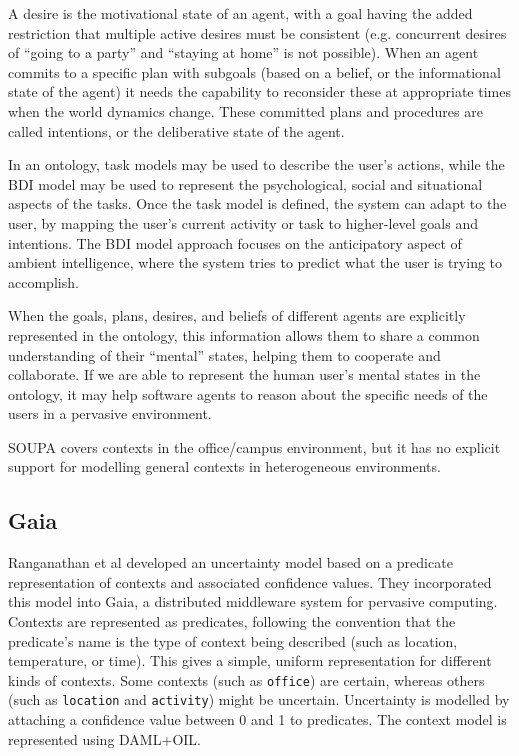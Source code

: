 A desire is the motivational state of an agent, with a goal having the added restriction that multiple active desires must be consistent (e.g. concurrent desires of ``going to a party'' and ``staying at home'' is not possible). When an agent commits to a specific plan with subgoals (based on a belief, or the informational state of the agent) it needs the capability to reconsider these at appropriate times when the world dynamics change. These committed plans and procedures are called intentions, or the deliberative state of the agent.



In an ontology, task models may be used to describe the user's actions, while the \ac{BDI} model may be used to represent the psychological, social and situational aspects of the tasks. Once the task model is defined, the system can adapt to the user, by mapping the user's current activity or task to higher-level goals and intentions. The \ac{BDI} model approach focuses on the anticipatory aspect of ambient intelligence, where the system tries to predict what the user is trying to accomplish.

When the goals, plans, desires, and beliefs of different agents are explicitly represented in the ontology, this information allows them to share a common understanding of their ``mental'' states, helping them to cooperate and collaborate. If we are able to represent the human user's mental states in the ontology, it may help software agents to reason about the specific needs of the users in a pervasive environment. 

\ac{SOUPA} covers contexts in the office/campus environment, but it has no explicit support for modelling general contexts in heterogeneous environments. 

\subsection{Gaia}
Ranganathan et al \cite{Ranganathan2004} developed an uncertainty model based on a predicate representation of contexts and associated confidence values. They incorporated this model into Gaia, a distributed middleware system for pervasive computing. Contexts are represented as predicates, following the convention that the predicate's name is the type of context being described (such as location, temperature, or time). This gives a simple, uniform representation for different kinds of contexts. Some contexts (such as \texttt{office}) are certain, whereas others (such as \texttt{location} and \texttt{activity}) might be uncertain. Uncertainty is modelled by attaching a confidence value between 0 and 1 to predicates. The context model is represented using \ac{DAML}+\ac{OIL}.


